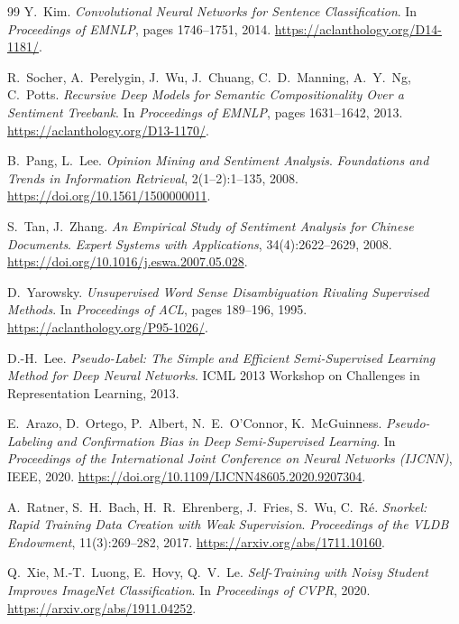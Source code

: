 \documentclass[11pt,a4paper]{article}
\begin{document}
\begin{thebibliography}{99}
Y.~Kim.
\newblock \emph{Convolutional Neural Networks for Sentence Classification}.
\newblock In \emph{Proceedings of EMNLP}, pages 1746--1751, 2014.
\newblock \url{https://aclanthology.org/D14-1181/}.

R.~Socher, A.~Perelygin, J.~Wu, J.~Chuang, C.~D.~Manning, A.~Y.~Ng, C.~Potts.
\newblock \emph{Recursive Deep Models for Semantic Compositionality Over a Sentiment Treebank}.
\newblock In \emph{Proceedings of EMNLP}, pages 1631--1642, 2013.
\newblock \url{https://aclanthology.org/D13-1170/}.

B.~Pang, L.~Lee.
\newblock \emph{Opinion Mining and Sentiment Analysis}.
\newblock \emph{Foundations and Trends in Information Retrieval}, 2(1--2):1--135, 2008.
\newblock \url{https://doi.org/10.1561/1500000011}.

S.~Tan, J.~Zhang.
\newblock \emph{An Empirical Study of Sentiment Analysis for Chinese Documents}.
\newblock \emph{Expert Systems with Applications}, 34(4):2622--2629, 2008.
\newblock \url{https://doi.org/10.1016/j.eswa.2007.05.028}.

D.~Yarowsky.
\newblock \emph{Unsupervised Word Sense Disambiguation Rivaling Supervised Methods}.
\newblock In \emph{Proceedings of ACL}, pages 189--196, 1995.
\newblock \url{https://aclanthology.org/P95-1026/}.

D.-H.~Lee.
\newblock \emph{Pseudo-Label: The Simple and Efficient Semi-Supervised Learning Method for Deep Neural Networks}.
\newblock ICML 2013 Workshop on Challenges in Representation Learning, 2013.

E.~Arazo, D.~Ortego, P.~Albert, N.~E.~O'Connor, K.~McGuinness.
\newblock \emph{Pseudo-Labeling and Confirmation Bias in Deep Semi-Supervised Learning}.
\newblock In \emph{Proceedings of the International Joint Conference on
Neural Networks (IJCNN)}, IEEE, 2020.
\newblock \url{https://doi.org/10.1109/IJCNN48605.2020.9207304}.

A.~Ratner, S.~H.~Bach, H.~R.~Ehrenberg, J.~Fries, S.~Wu, C.~R\'e.
\newblock \emph{Snorkel: Rapid Training Data Creation with Weak Supervision}.
\newblock \emph{Proceedings of the VLDB Endowment}, 11(3):269--282, 2017.
\newblock \url{https://arxiv.org/abs/1711.10160}.

Q.~Xie, M.-T.~Luong, E.~Hovy, Q.~V.~Le.
\newblock \emph{Self-Training with Noisy Student Improves ImageNet Classification}.
\newblock In \emph{Proceedings of CVPR}, 2020.
\newblock \url{https://arxiv.org/abs/1911.04252}.


\end{thebibliography}
\end{document}
